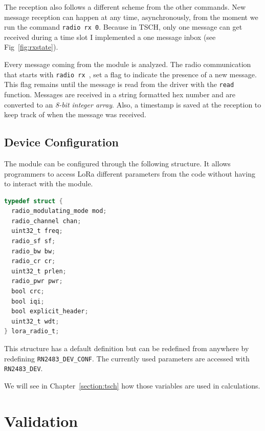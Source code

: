 The reception also follows a different scheme from the other commands.
New message reception can happen at any time, asynchronously, from the moment
we run the command \lstinline{radio rx 0}.
Because in TSCH, only one message can get received during a time slot
I implemented a one message inbox (see Fig~\ref{fig:rxstate}).

Every message coming from the module is analyzed.
The radio communication that starts with \lstinline{radio rx }, set a flag to
indicate the presence of a new message.
This flag remains until the message is read from the driver with the
\lstinline{read} function.
Messages are received in a string formatted hex number and are converted to an
\emph{8-bit integer array}.
Also, a timestamp is saved at the reception to keep track of when the
message was received.



\subsection{Device Configuration}

The module can be configured through the following structure.
It allows programmers to access LoRa different parameters from the code without
having to interact with the module.

\begin{lstlisting}[language=C]
typedef struct {
  radio_modulating_mode mod;
  radio_channel chan;
  uint32_t freq;
  radio_sf sf;
  radio_bw bw;
  radio_cr cr;
  uint32_t prlen;
  radio_pwr pwr;
  bool crc;
  bool iqi;
  bool explicit_header;
  uint32_t wdt;
} lora_radio_t;
\end{lstlisting}

This structure has a default definition but can be redefined from anywhere
by redefining \lstinline{RN2483_DEV_CONF}.
The currently used parameters are accessed with \lstinline{RN2483_DEV}.

We will see in Chapter~\ref{section:tsch} how those variables are used in
calculations.

\section{Validation}


